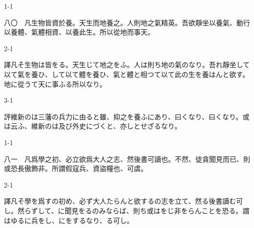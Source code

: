 \documentclass[tate,paper=b6j,jafontsize=9pt]{jlreq}
\begin{document}
\begin{azconvIndented}{1\zw}{-1\zw}

八〇　凡生物皆資於養。天生而地養之。人則地之氣精英。吾欲靜坐以養氣、動行以養體、氣體相資、以養此生。所以從地而事\azconvKunten{\azconvIR}天。

\end{azconvIndented}
\begin{azconvIndented}{2\zw}{-1\zw}

譯凡そ生物は皆をる。天生じて地之をふ。人は則ち地の氣のなり。吾れ靜坐して以て氣を養ひ、して以て體を養ひ、氣と體と相つて以て此の生を養はんと欲す。地に從うて天に事ふる所以なり。

\end{azconvIndented}
\begin{azconvIndented}{3\zw}{-1\zw}

評維新のは三藩の兵力に由ると雖、抑之を養ふにあり、曰くなり、曰くなり。或は云ふ、維新のは及び外史にづくと、亦しとせざるなり。

\end{azconvIndented}

\begin{azconvIndented}{1\zw}{-1\zw}

八一　凡爲學之初、必立欲爲大人之志、然後書可讀也。不然、徒貪聞見而已、則或恐長傲飾\azconvKunten{\azconvIR}非。所謂假寇兵、資盜糧也、可虞。

\end{azconvIndented}
\begin{azconvIndented}{2\zw}{-1\zw}

譯凡そ學を爲すの初め、必ず大人たらんと欲するの志を立て、然る後書讀む可し。然らずして、に聞見をるのみならば、則ち或はをじ非をらんことを恐る。謂はゆるに兵をし、にをするなり、る可し。

\end{azconvIndented}
\end{document}
